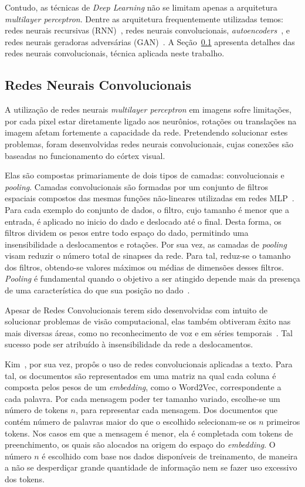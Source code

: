 Contudo, as técnicas de \textit{Deep Learning} não se limitam apenas a arquitetura \textit{multilayer perceptron}.
Dentre as arquitetura frequentemente utilizadas temos: redes neurais recursivas (RNN)~\cite{hopfield87}, redes neurais
convolucionais, \textit{autoencoders}~\cite{hinton06_2}, e redes neurais geradoras adversárias
(GAN)~\cite{goodfellow14_2}.
A Seção~\ref{sec:convolucionais} apresenta detalhes das redes neurais convolucionais, técnica aplicada neste trabalho.

\subsection{Redes Neurais Convolucionais} \label{sec:convolucionais}

A utilização de redes neurais \textit{multilayer perceptron} em imagens sofre limitações, por cada pixel estar
diretamente ligado aos neurônios, rotações ou translações na imagem afetam fortemente a capacidade da rede.
Pretendendo solucionar estes problemas, foram desenvolvidas redes neurais convolucionais, cujas conexões são baseadas
no funcionamento do córtex visual.

Elas são compostas primariamente de dois tipos de camadas: convolucionais e \textit{pooling}.
Camadas convolucionais são formadas por um conjunto de filtros espaciais compostos das mesmas funções não-lineares
utilizadas em redes MLP~\cite{goodfellow16}.
Para cada exemplo do conjunto de dados, o filtro, cujo tamanho é menor que a entrada, é aplicado no inicio do dado e
deslocado até o final.
Desta forma, os filtros dividem os pesos entre todo espaço do dado, permitindo uma insensibilidade a deslocamentos e
rotações.
Por sua vez, as camadas de \textit{pooling} visam reduzir o número total de sinapses da rede.
Para tal, reduz-se o tamanho dos filtros, obtendo-se valores máximos ou médias de dimensões desses filtros.
\textit{Pooling} é fundamental quando o objetivo a ser atingido depende mais da presença de uma característica do que
sua posição no dado~\cite{goodfellow16}.

Apesar de Redes Convolucionais terem sido desenvolvidas com intuito de solucionar problemas de visão computacional, elas
também obtiveram êxito nas mais diversas áreas, como no reconhecimento de voz e em séries temporais~\cite{lecun95}.
Tal sucesso pode ser atribuído à insensibilidade da rede a deslocamentos.

Kim~\cite{kim14}, por sua vez, propôs o uso de redes convolucionais aplicadas a texto.
Para tal, os documentos são representados em uma matriz na qual cada coluna é composta pelos pesos de um
\textit{embedding}, como o Word2Vec, correspondente a cada palavra.
Por cada mensagem poder ter tamanho variado, escolhe-se um número de tokens $n$, para representar cada mensagem.
Dos documentos que contém número de palavras maior do que o escolhido selecionam-se os $n$ primeiros tokens.
Nos casos em que a mensagem é menor, ela é completada com tokens de preenchimento, os quais são alocados na origem do
espaço do \textit{embedding}.
O número $n$ é escolhido com base nos dados disponíveis de treinamento, de maneira a não se desperdiçar grande
quantidade de informação nem se fazer uso excessivo dos tokens.

